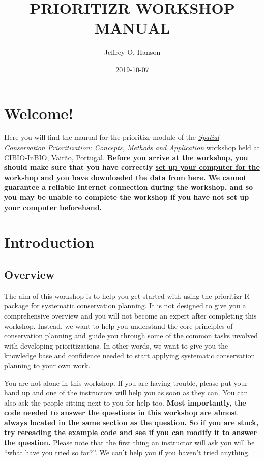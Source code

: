 \documentclass[12pt,]{book}
\title{PRIORITIZR WORKSHOP MANUAL}
\author{Jeffrey O. Hanson}
\date{2019-10-07}
\begin{document}
\maketitle

{
\hypersetup{linkcolor=black}
\setcounter{tocdepth}{0}
\tableofcontents
}
\chapter{Welcome!}\label{welcome}

Here you will find the manual for the prioritizr module of the
\href{https://cibio.up.pt/workshops--courses/details/advanced-course-spatial-conservation-prioritization-}{\emph{Spatial
Conservation Prioritization: Concepts, Methods and Application}
workshop} held at CIBIO-InBIO, Vairão, Portugal. \textbf{Before you
arrive at the workshop, you should make sure that you have correctly
\protect\hyperlink{setup}{set up your computer for the workshop} and you
have
\href{https://github.com/prioritizr/cibio-workshop/raw/master/data.zip}{downloaded
the data from here}. We cannot guarantee a reliable Internet connection
during the workshop, and so you may be unable to complete the workshop
if you have not set up your computer beforehand.}

\chapter{Introduction}\label{introduction}

\section{Overview}\label{overview}

The aim of this workshop is to help you get started with using the
prioritizr R package for systematic conservation planning. It is not
designed to give you a comprehensive overview and you will not become an
expert after completing this workshop. Instead, we want to help you
understand the core principles of conservation planning and guide you
through some of the common tasks involved with developing
prioritizations. In other words, we want to give you the knowledge base
and confidence needed to start applying systematic conservation planning
to your own work.

You are not alone in this workshop. If you are having trouble, please
put your hand up and one of the instructors will help you as soon as
they can. You can also ask the people sitting next to you for help too.
\textbf{Most importantly, the code needed to answer the questions in
this workshop are almost always located in the same section as the
question. So if you are stuck, try rereading the example code and see if
you can modify it to answer the question.} Please note that the first
thing an instructor will ask you will be ``what have you tried so
far?''. We can't help you if you haven't tried anything.
\end{document}
